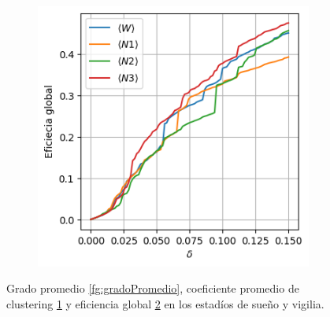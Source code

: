 \documentclass{article}
\begin{document}
\begin{figure}[ht]
\begin{subfigure}[b]{0.32\linewidth}
    \caption{}
	\label{fg:coeficienteClusteringPromedio}
  \end{subfigure}
  \begin{subfigure}[b]{0.32\linewidth}
    \includegraphics[width= \textwidth]{eficienciaGlobal.png}
    \caption{}
	\label{fg:eficienciaGlobal}
  \end{subfigure}
  \caption{Grado promedio \ref{fg:gradoPromedio}, coeficiente promedio de clustering \ref{fg:coeficienteClusteringPromedio} y eficiencia global \ref{fg:eficienciaGlobal} en los estadíos de sueño y vigilia.}
  \label{fg:gesamte}
\end{figure}
\end{document}
